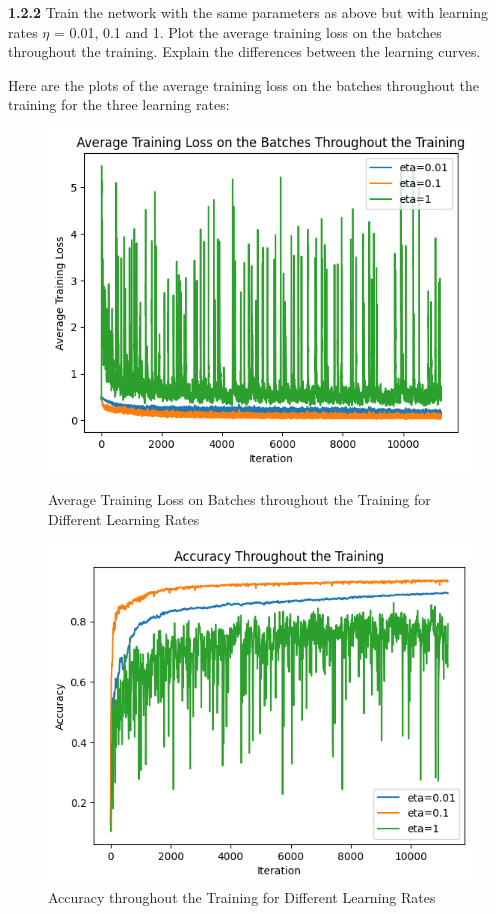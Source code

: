 \documentclass[a4paper, 12pt]{article}
\begin{document}
\bigskip

\textcolor{myblue}{
    \textbf{1.2.2} Train the network with the same parameters as above but with learning rates $\eta$ = 0.01, 0.1 and
1. Plot the average training loss on the batches throughout the training. Explain the differences
between the learning curves.
}

Here are the plots of the average training loss on the batches throughout the training for the three learning rates:

\begin{figure}[H]
    \centering
    \begin{minipage}{0.45\textwidth}
        \centering
        \includegraphics[width=\linewidth]{../figs/1-2-2--1.png}
        \caption{Average Training Loss on Batches throughout the Training for Different Learning Rates}
        \label{fig:scenario1}
    \end{minipage}\hfill
    \begin{minipage}{0.45\textwidth}
        \centering
        \includegraphics[width=\linewidth]{../figs/1-2-2--2.png}
        \caption{Accuracy throughout the Training for Different Learning Rates}
        \label{fig:scenario2}
    \end{minipage}
\end{figure}
\end{document}
